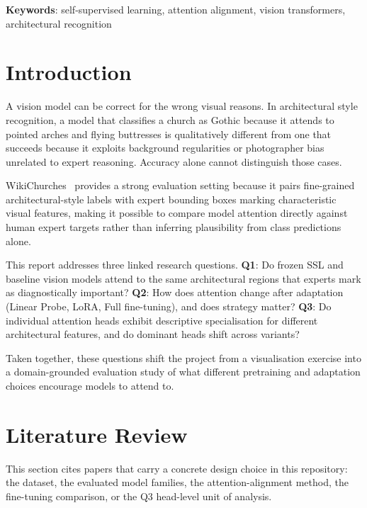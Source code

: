 \documentclass{article}
\begin{document}
\textbf{Keywords}: self-supervised learning, attention alignment, vision transformers, architectural recognition

\section{Introduction}
\label{sec:intro}

A vision model can be correct for the wrong visual reasons. In architectural
style recognition, a model that classifies a church as Gothic because it attends
to pointed arches and flying buttresses is qualitatively different from one that
succeeds because it exploits background regularities or photographer bias
unrelated to expert reasoning. Accuracy alone cannot distinguish those cases.

WikiChurches~\cite{Barz21WikiChurches} provides a strong evaluation setting
because it pairs fine-grained architectural-style labels with expert bounding
boxes marking characteristic visual features, making it possible to compare
model attention directly against human expert targets rather than inferring
plausibility from class predictions alone.

This report addresses three linked research questions. \textbf{Q1}: Do frozen
SSL and baseline vision models attend to the same architectural regions that
experts mark as diagnostically important? \textbf{Q2}: How does attention change
after adaptation (Linear Probe, LoRA, Full fine-tuning), and does strategy
matter? \textbf{Q3}: Do individual attention heads exhibit descriptive
specialisation for different architectural features, and do dominant heads shift
across variants?

Taken together, these questions shift the project from a visualisation exercise
into a domain-grounded evaluation study of what different pretraining and
adaptation choices encourage models to attend to.

\section{Literature Review}
\label{sec:lit}

This section cites papers that carry a concrete design choice in this
repository: the dataset, the evaluated model families, the attention-alignment
method, the fine-tuning comparison, or the Q3 head-level unit of analysis.
\end{document}
